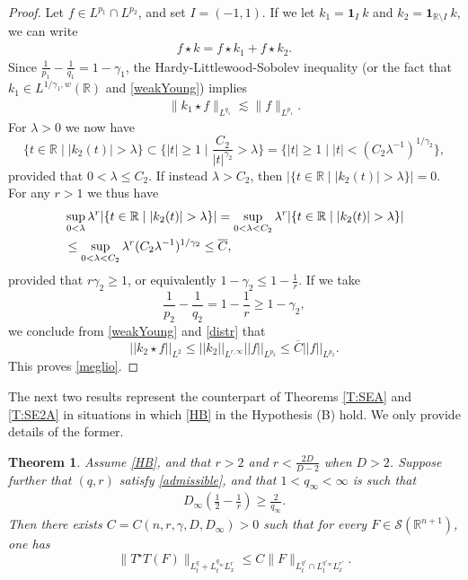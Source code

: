 \documentclass[11pt,letter]{amsart}
\def \R {\mathbb{R}}
\newcommand{\la}{\lambda}
\numberwithin{equation}{section}
\newtheorem{theorem}{Theorem}[section]
\numberwithin{equation}{section}
\begin{document}
\begin{proof}
Let $f\in L^{p_{1}}\cap L^{p_{2}}$, and set $I=(-1,1)$. If we let $k_1 = \mathbf 1_I\ k$ and $k_2 = \mathbf 1_{\R \setminus I}\ k$, we can write 
\begin{align*}
f\star k= f\star k_1 + f\star k_2.
\end{align*}
Since $\frac{1}{p_{1}}-\frac{1}{q_{1}}=1-\gamma_{1}$, the Hardy-Littlewood-Sobolev inequality (or the fact that $k_1\in L^{1/\gamma_1,w}(\R)$ and \eqref{weakYoung}) implies
\begin{align*}
\|k_{1}\star f\|_{L^{q_{1}}}\lesssim \|f\|_{L^{p_{1}}}.
\end{align*}
For $\la>0$ we now have
\[
\{t\in \R\mid |k_2(t)|>\la\} \subset \{|t|\ge 1\mid \frac{C_2}{|t|^{\gamma_2}} > \la\} = \{|t|\ge 1\mid |t|< (C_2\la^{-1})^{1/\gamma_2}\},
\]
provided that $0<\la \le C_2$. If instead $\la >C_2$, then $|\{t\in \R\mid |k_2(t)|>\la\}| = 0$. For any $r>1$ we thus have
\begin{align}\label{distr}
& \sup_{0<\la}\la^{r} |\{t\in \R\mid |k_2(t)|>\la\}| = \sup_{0<\la<C_2}\la^{r} |\{t\in \R\mid |k_2(t)|>\la\}|
\\
& \le \sup_{0<\la<C_2} \la^{r}(C_2\la^{-1})^{1/\gamma_2} \le \overline C,
\notag
\end{align}
provided that $r\gamma_{2}\ge1$, or equivalently $1 - \gamma_2 \le 1 - \frac 1r$. If we take 
\[
\frac{1}{p_{2}}-\frac{1}{q_{2}}=1-\frac{1}{r} \ge 1 - \gamma_2,
\] 
we conclude from \eqref{weakYoung} and \eqref{distr} that 
\[
||k_2 \star f||_{L^2} \le ||k_2||_{L^{r,\infty}} ||f||_{L^{p_2}} \le \overline C ||f||_{L^{p_2}}.
\]
This proves \eqref{meglio}. 

\end{proof}

The next two results represent the counterpart of Theorems \ref{T:SEA} and \ref{T:SE2A} in situations in which \eqref{HB} in the Hypothesis (B) hold. We only provide details of the former. 

\begin{theorem}\label{T:SE2K} 
Assume \eqref{HB}, and that $r>2$ and $r<\frac{2D}{D-2}$ when $D>2$.  
Suppose further that $(q,r)$ satisfy \eqref{admissible}, and that $1<q_{\infty} <\infty$ is such that
\begin{align}\label{inftyadm2}
D_{\infty}(\frac{1}{2}-\frac{1}{r})\ge \frac{2}{q_{\infty}}.
\end{align} 
Then there exists $C = C(n,r,\gamma, D, D_\infty)>0$ 
such that for every $F\in \mathscr S(\R^{n+1})$, one has  
\begin{equation}\label{FStriDrift}
\|T^{\star}T(F)\|_{L^{q}_{t}+L^{q_{\infty}}_{t} L^{r}_{x}}\le C \|F\|_{L^{q'}_{t}\cap L^{q'_{\infty}}_{t} L^{r'}_{x}}.
	\end{equation}
\end{theorem}
\end{document}

